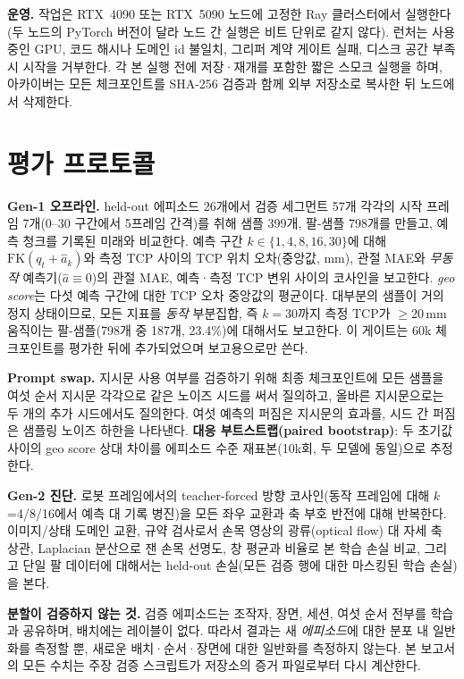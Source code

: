 \documentclass[conference,10pt]{IEEEtran}
\newcommand{\mm}{\,mm\xspace}
\begin{document}
\textbf{운영.} 작업은 RTX~4090 또는 RTX~5090 노드에 고정한 Ray 클러스터에서 실행한다(두 노드의 PyTorch 버전이 달라 노드 간 실행은
비트 단위로 같지 않다). 런처는 사용 중인 GPU, 코드 해시나 도메인 id 불일치, 그리퍼 계약 게이트 실패, 디스크 공간 부족 시 시작을
거부한다. 각 본 실행 전에 저장·재개를 포함한 짧은 스모크 실행을 하며, 아카이버는 모든 체크포인트를 SHA-256 검증과 함께 외부 저장소로
복사한 뒤 노드에서 삭제한다.

\section{평가 프로토콜}\label{sec:eval}
\textbf{Gen-1 오프라인.} held-out 에피소드 26개에서 검증 세그먼트 57개 각각의 시작 프레임 7개(0--30 구간에서 5프레임 간격)를 취해
샘플 399개, 팔-샘플 798개를 만들고, 예측 청크를 기록된 미래와 비교한다. 예측 구간 $k\in\{1,4,8,16,30\}$에 대해
$\mathrm{FK}(q_t+\hat a_k)$와 측정 TCP 사이의 TCP 위치 오차(중앙값, mm), 관절 MAE와 \emph{무동작} 예측기($\hat a\equiv0$)의 관절
MAE, 예측·측정 TCP 변위 사이의 코사인을 보고한다. \emph{geo score}는 다섯 예측 구간에 대한 TCP 오차 중앙값의 평균이다. 대부분의
샘플이 거의 정지 상태이므로, 모든 지표를 \emph{동작} 부분집합, 즉 $k{=}30$까지 측정 TCP가 $\ge$20\mm{} 움직이는 팔-샘플(798개 중
187개, 23.4\%)에 대해서도 보고한다. 이 게이트는 60k 체크포인트를 평가한 뒤에 추가되었으며 보고용으로만 쓴다.

\textbf{Prompt swap.} 지시문 사용 여부를 검증하기 위해 최종 체크포인트에 모든 샘플을 여섯 순서 지시문 각각으로 같은 노이즈 시드를
써서 질의하고, 올바른 지시문으로는 두 개의 추가 시드에서도 질의한다. 여섯 예측의 퍼짐은 지시문의 효과를, 시드 간 퍼짐은 샘플링
노이즈 하한을 나타낸다. \textbf{대응 부트스트랩(paired bootstrap)}: 두 초기값 사이의 geo score 상대 차이를 에피소드 수준
재표본(10k회, 두 모델에 동일)으로 추정한다.

\textbf{Gen-2 진단.} 로봇 프레임에서의 teacher-forced 방향 코사인(동작 프레임에 대해 $k$=4/8/16에서 예측 대 기록 병진)을 모든 좌우
교환과 축 부호 반전에 대해 반복한다. 이미지/상태 도메인 교환, 규약 검사로서 손목 영상의 광류(optical flow) 대 자세 축 상관, Laplacian
분산으로 잰 손목 선명도, 창 평균과 비율로 본 학습 손실 비교, 그리고 단일 팔 데이터에 대해서는 held-out 손실(모든 검증 행에 대한
마스킹된 학습 손실)을 본다.

\textbf{분할이 검증하지 않는 것.} 검증 에피소드는 조작자, 장면, 세션, 여섯 순서 전부를 학습과 공유하며, 배치에는 레이블이 없다.
따라서 결과는 새 \emph{에피소드}에 대한 분포 내 일반화를 측정할 뿐, 새로운 배치·순서·장면에 대한 일반화를 측정하지 않는다. 본
보고서의 모든 수치는 주장 검증 스크립트가 저장소의 증거 파일로부터 다시 계산한다.
\end{document}
